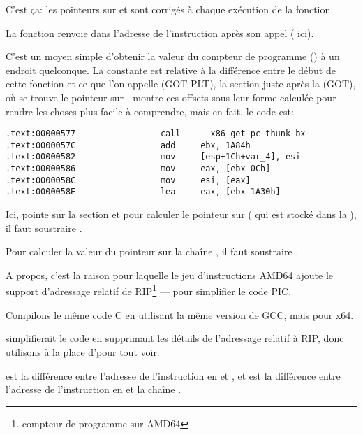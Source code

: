C'est ça: les pointeurs sur \retstring{} et \globvar{} sont corrigés à chaque exécution de la fonction.

\par La fonction  renvoie dans \EBX l'adresse de l'instruction après son appel ( ici).

C'est un moyen simple d'obtenir la valeur du compteur de programme (\EIP) à un endroit quelconque.
La constante  est relative à la différence entre le début de cette fonction et ce que l'on appelle
 (GOT PLT), la section juste après la  (GOT), où se trouve le pointeur sur \globvar{}.
\IDA montre ces offsets sous leur forme calculée pour rendre les choses plus facile à comprendre, mais en fait, le code est:

\begin{lstlisting}[style=customasmx86]
.text:00000577                 call    __x86_get_pc_thunk_bx
.text:0000057C                 add     ebx, 1A84h
.text:00000582                 mov     [esp+1Ch+var_4], esi
.text:00000586                 mov     eax, [ebx-0Ch]
.text:0000058C                 mov     esi, [eax]
.text:0000058E                 lea     eax, [ebx-1A30h]
\end{lstlisting}

Ici, \EBX pointe sur la section  et pour calculer le pointeur sur \globvar{} ( qui est stocké dans
la ), il faut soustraire .

Pour calculer la valeur du pointeur sur la chaîne \retstring{}, il faut soustraire .


A propos, c'est la raison pour laquelle le jeu d'instructions AMD64 ajoute le support d'adressage relatif de RIP\footnote{compteur de programme sur AMD64} --- pour simplifier le code PIC.

Compilons le même code C en utilisant la même version de GCC, mais pour x64.

\IDA simplifierait le code en supprimant les détails de l'adressage relatif à RIP,
donc utilisons  à la place d'\IDA pour tout voir:



 est la différence entre l'adresse de l'instruction en  et \globvar{}, et 
 est la différence entre l'adresse de l'instruction en
 et la chaîne \retstring{}.

